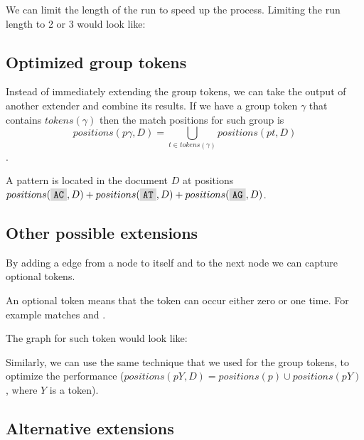 \begin{figure}[H]
	
\end{figure}

We can limit the length of the run to speed up the process. Limiting the run length to 2 or 3 would look like:

\begin{figure}[H]
	
\end{figure}

\subsection{Optimized group tokens}

Instead of immediately extending the group tokens, we can take the output of another extender and combine its results. If we have a group token $\gamma$ that contains $tokens(\gamma)$ then the match positions for such group is $$positions(p\gamma, D) = \bigcup_{t \in tokens(\gamma)} positions(pt, D) $$.

\begin{exmp}
A pattern  is located in the document $D$ at positions $positions(\R{AC}, D) + positions(\R{AT}, D) + positions(\R{AG}, D)$.
\end{exmp}

\subsection{Other possible extensions}

By adding a edge from a node to itself and to the next node we can capture optional tokens.

\begin{exmp}
An optional token  means that the token  can occur either zero or one time. For example  matches  and .
\end{exmp}

The graph for such token would look like:

\begin{figure}[H]
	
\end{figure}

 Similarly, we can use the same technique that we used for the group tokens, to optimize the performance ($positions(pY, D) = positions(p) \cup positions(pY)$, where $Y$ is a token).

\subsection{Alternative extensions}

